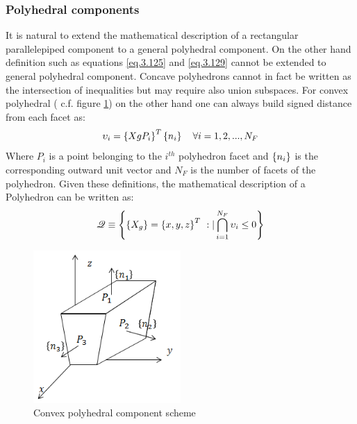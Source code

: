   \subsubsection{Polyhedral components}
  \label{ss_poly}
  It is natural to extend the mathematical description of a rectangular parallelepiped component to a general polyhedral component. On the other hand definition such as equations \ref{eq.3.125} and \ref{eq.3.129} cannot be extended to general polyhedral component. Concave polyhedrons cannot in fact be written as the intersection of inequalities but may require also union subspaces. For convex polyhedral ( c.f. figure \ref{fig:3.32})
   on the other hand one can always build signed distance from each facet as: 
   \begin{equation}
   \upsilon_i=\left\lbrace{XgP_i}\right \rbrace^T\left\lbrace{n_i}\right \rbrace \quad \forall i=1,2,...,N_F
   \end{equation}
   Where $P_i$ is a point belonging to the $i^{th}$ polyhedron facet and $\left\lbrace{n_i}\right \rbrace$ is the corresponding outward unit vector and $N_F$ is the number of facets of the polyhedron.  Given these definitions, the mathematical description of a Polyhedron can be written as:
   \begin{equation}
           \label{eq.3.131}
           \mathscr{Q}\equiv\VectorVar{\VectorVar{X_g}=\VectorVar{x,y,z}^T\ :| \bigcap_{i=1}^{N_F}{\upsilon_i\leq 0}}
    \end{equation} 
   \begin{figure}[!ht]
      \centering
       \includegraphics[width=0.5\textwidth]{images/Ch3/convex_polyhedral_component}
     \caption{Convex polyhedral component scheme}
     \label{fig:3.32}       %
     \end{figure}
